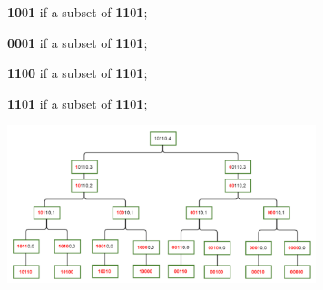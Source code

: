     \textbf{10}0\textbf{1} if a subset of \textbf{11}0\textbf{1};

    \textbf{00}0\textbf{1} if a subset of \textbf{11}0\textbf{1};
    
    \textbf{11}0\textbf{0} if a subset of \textbf{11}0\textbf{1};
    
    \textbf{11}0\textbf{1} if a subset of \textbf{11}0\textbf{1};

    \begin{center}
        \includegraphics[width=9cm]{content/dynamic-programming/sos-example.pdf}
    \end{center}

